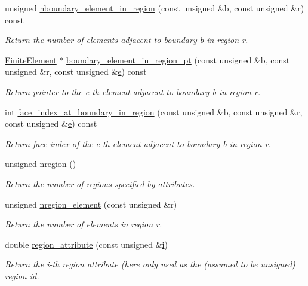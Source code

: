 \begin{DoxyCompactItemize}
unsigned \hyperlink{classoomph_1_1TetMeshBase_a5aa803726d0e3a08ba5673452f919978}{nboundary\+\_\+element\+\_\+in\+\_\+region} (const unsigned \&b, const unsigned \&r) const
\begin{DoxyCompactList}\small\item\em Return the number of elements adjacent to boundary b in region r. \end{DoxyCompactList}\item 
\hyperlink{classoomph_1_1FiniteElement}{Finite\+Element} $\ast$ \hyperlink{classoomph_1_1TetMeshBase_a895d0c0937ecba9c9872885f8b31bebd}{boundary\+\_\+element\+\_\+in\+\_\+region\+\_\+pt} (const unsigned \&b, const unsigned \&r, const unsigned \&\hyperlink{cfortran_8h_a37cd013acc76697829c324bdd8562d82}{e}) const
\begin{DoxyCompactList}\small\item\em Return pointer to the e-\/th element adjacent to boundary b in region r. \end{DoxyCompactList}\item 
int \hyperlink{classoomph_1_1TetMeshBase_a1efd6c45576e53e0f8c0ccc9c388800c}{face\+\_\+index\+\_\+at\+\_\+boundary\+\_\+in\+\_\+region} (const unsigned \&b, const unsigned \&r, const unsigned \&\hyperlink{cfortran_8h_a37cd013acc76697829c324bdd8562d82}{e}) const
\begin{DoxyCompactList}\small\item\em Return face index of the e-\/th element adjacent to boundary b in region r. \end{DoxyCompactList}\item 
unsigned \hyperlink{classoomph_1_1TetMeshBase_a3d4d45ac64c6ee59cadf3a08d62a76f2}{nregion} ()
\begin{DoxyCompactList}\small\item\em Return the number of regions specified by attributes. \end{DoxyCompactList}\item 
unsigned \hyperlink{classoomph_1_1TetMeshBase_afe7b2d58a656feafd5ae725139aeb517}{nregion\+\_\+element} (const unsigned \&r)
\begin{DoxyCompactList}\small\item\em Return the number of elements in region r. \end{DoxyCompactList}\item 
double \hyperlink{classoomph_1_1TetMeshBase_a2a185b3c2ad528a74d2e6c27f7ffede5}{region\+\_\+attribute} (const unsigned \&\hyperlink{cfortran_8h_adb50e893b86b3e55e751a42eab3cba82}{i})
\begin{DoxyCompactList}\small\item\em Return the i-\/th region attribute (here only used as the (assumed to be unsigned) region id. \end{DoxyCompactList}\item 

\end{DoxyCompactItemize}
